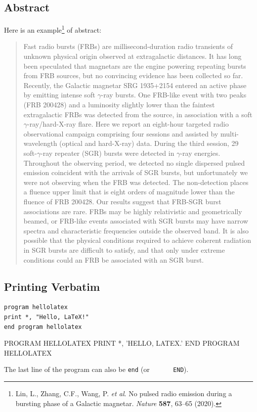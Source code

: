 \documentclass{article}
\begin{document}
    \subsection{Abstract}
    Here is an example\footnote{
        Lin, L., Zhang, C.F., Wang, P. \textit{et al}.
        No pulsed radio emission during a bursting phase of a Galactic magnetar.
        \textit{Nature} \textbf{587}, 63--65 (2020).} of abstract:
    \begin{abstract}
        Fast radio bursts (FRBs) are millisecond-duration radio transients of
        unknown physical origin observed at extragalactic distances. It has
        long been speculated that magnetars are the engine powering repeating
        bursts from FRB sources, but no convincing evidence has been collected
        so far. Recently, the Galactic magnetar SRG 1935+2154 entered an active
        phase by emitting intense soft $\gamma$-ray bursts. One FRB-like event
        with two peaks (FRB 200428) and a luminosity slightly lower than the
        faintest extragalactic FRBs was detected from the source, in
        association with a soft $\gamma$-ray/hard-X-ray flare. Here we report
        an eight-hour targeted radio observational campaign comprising four
        sessions and assisted by multi-wavelength (optical and hard-X-ray)
        data. During the third session, 29 soft-$\gamma$-ray repeater (SGR)
        bursts were detected in $\gamma$-ray energies. Throughout the observing
        period, we detected no single dispersed pulsed emission coincident with
        the arrivals of SGR bursts, but unfortunately we were not observing
        when the FRB was detected. The non-detection places a fluence upper
        limit that is eight orders of magnitude lower than the fluence of FRB
        200428. Our results suggest that FRB-SGR burst associations are rare.
        FRBs may be highly relativistic and geometrically beamed, or FRB-like
        events associated with SGR bursts may have narrow spectra and
        characteristic frequencies outside the observed band. It is also
        possible that the physical conditions required to achieve coherent
        radiation in SGR bursts are difficult to satisfy, and that only under
        extreme conditions could an FRB be associated with an SGR burst.
    \end{abstract}
    \newpage
    \subsection{Printing Verbatim}
\begin{verbatim}
program hellolatex
print *, "Hello, LaTeX!"
end program hellolatex
\end{verbatim}
\begin{verbatim*}
      PROGRAM HELLOLATEX
      PRINT *, 'HELLO, LATEX.'
      END PROGRAM HELLOLATEX
\end{verbatim*}
    The last line of the program can also be \verb|end| (or \verb*|      END|).
\end{document}
